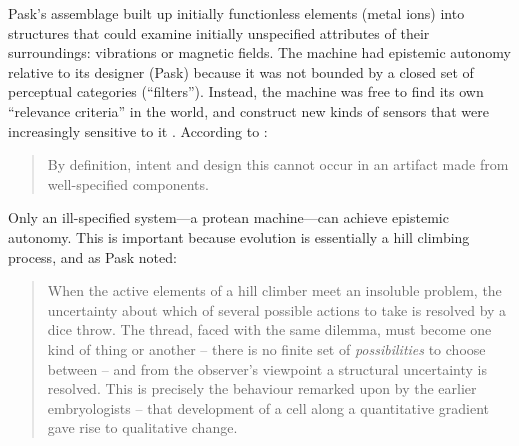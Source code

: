 

Pask's assemblage built up initially functionless elements (metal ions) into structures
that could examine
initially unspecified attributes of their surroundings: vibrations or magnetic fields.
The machine had epistemic autonomy
relative to its designer (Pask) because it was
not bounded by a
closed set of perceptual categories (``filters'').
Instead,
the machine was free to 
find its own ``relevance criteria'' in the world,
and
construct new kinds of sensors that were increasingly sensitive to it \cite{cariani1993evolve}.
According to \citet{pask1961approach}:
%
\begin{quote}
\small
By definition, intent and design this cannot occur in an artifact made from well-specified components. 
\end{quote}
%
Only an ill-specified system---a protean machine---can achieve epistemic autonomy.
This is important because 
evolution is essentially a hill climbing process, and as
Pask noted:
%
\begin{quote}
\small
When the active elements of a hill climber meet an insoluble
problem, the uncertainty about which of several possible actions
to take is resolved by a dice throw. 
The thread, faced with the same dilemma, must become one kind of thing or another -- there
is no finite set of \textit{possibilities} to choose between %
-- and from the observer's viewpoint a structural uncertainty is resolved. 
This is precisely the behaviour remarked upon by the earlier embryologists -- that development of a cell along a quantitative gradient gave rise to qualitative change.
\end{quote}



